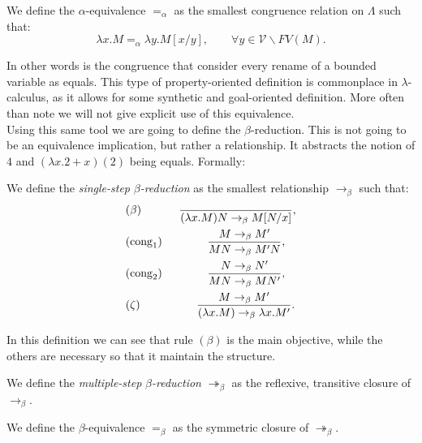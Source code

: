 \begin{definition}
  We define the $\alpha$-equivalence $=_\alpha$ as the smallest congruence relation on $\Lambda$ such that:
  $$\lambda x. M =_\alpha \lambda y. M[x/y], \qquad \forall y \in \mathcal{V} \backslash FV(M).$$
\end{definition}
In other words is the congruence that consider every rename of a bounded variable as equals. This type of property-oriented definition is commonplace in $\lambda$-calculus, as it allows for some synthetic and goal-oriented definition. More often than note we will not give explicit use of this equivalence.\\



Using this same tool we are going to define the $\beta$-reduction. This is not going to be an equivalence implication, but rather a relationship. It abstracts the notion of $4$ and $(\lambda x. 2+x)(2)$ being equals. Formally:

\begin{definition}
  We define the \emph{single-step} $\beta$\emph{-reduction} as the smallest relationship $\to_\beta$ such that:%
  \begin{align*}
    &(\beta) \qquad\ \ \  \ {\ \over(\lambda x.M)N \to_\beta M[N/x]},\\
    &(\operatorname{cong}_1)\qquad\qquad{ M \to_\beta M' \over MN \to_\beta M'N },\\
    &(\operatorname{cong}_2)\qquad\qquad{ N \to_\beta N' \over MN \to_\beta MN' },\\
    &(\zeta) \qquad\qquad \ \  \ {M\to_\beta M' \over(\lambda x.M) \to_\beta \lambda x.M'}.\\
  \end{align*}
\end{definition}

\begin{remark}
  In this definition we can see that rule $(\beta)$ is the main objective, while the others are necessary so that it maintain the structure.
\end{remark}
\begin{definition}
  We define the \emph{multiple-step} $\beta$\emph{-reduction} $\twoheadrightarrow_\beta$ as the reflexive, transitive closure of $\to_\beta$.
\end{definition}
\begin{definition}
  We define the $\beta$-equivalence $=_\beta$ as the symmetric closure of $\twoheadrightarrow_\beta$.
\end{definition}

